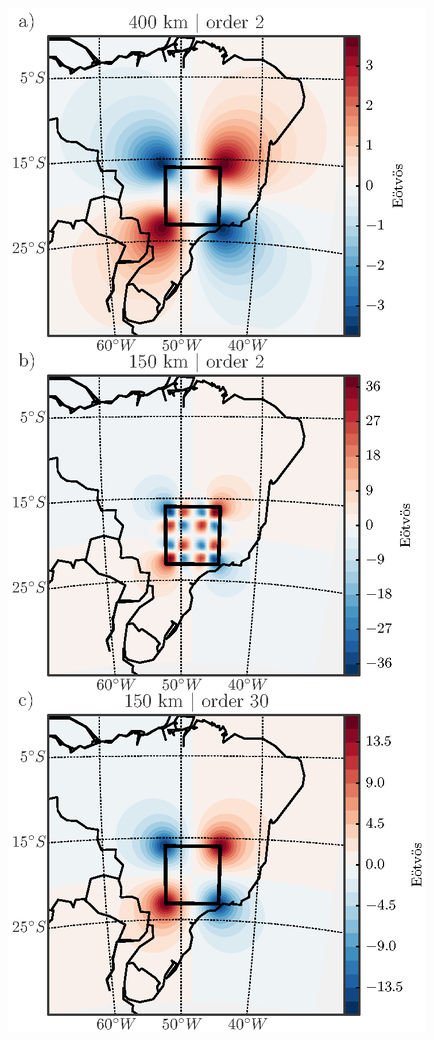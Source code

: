 \documentclass[extra]{gji}
\begin{document}
\begin{figure}
    \centering
    \includegraphics[width=\columnwidth]{figs/vary-height-and-order}

\end{figure}
\end{document}
